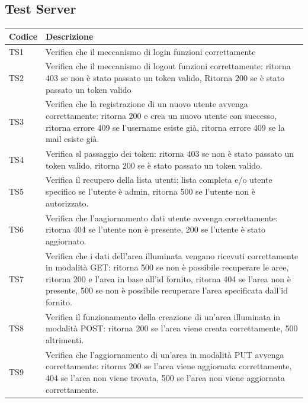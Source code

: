 \documentclass[a4paper, 12pt]{article}
\begin{document}
\subsection*{Test Server}
\setlength\tabcolsep{4pt}
\begin{center}
	\begin{tabularx}{\textwidth}{|X|X|}
	\hline
		\textbf{Codice} & \textbf{Descrizione }  \\
		\hline
		TS1 & Verifica che il meccanismo di login funzioni correttamente           \\
		\hline
		TS2 &  Verifica che il meccanismo di logout funzioni correttamente: ritorna 403 se non è stato passato un token valido, Ritorna 200 se è stato passato un token valido           \\
		\hline
		TS3 & Verifica che la registrazione di un nuovo utente avvenga correttamente: ritorna 200 e crea un nuovo utente con successo, ritorna errore 409 se l'username esiste già, ritorna errore 409 se la mail esiste già.   \\
		\hline
		TS4 &  Verifica sl passaggio dei token: ritorna 403 se non è stato passato un token valido, ritorna 200 se è stato passato un token valido.   \\
		\hline
		TS5 & Verifica il recupero della lista utenti: lista completa e/o utente specifico se l'utente è admin, ritorna 500 se l'utente non è autorizzato.   \\
		\hline
		TS6 & Verifica che l'aagiornamento dati utente avvenga correttamente: ritorna 404 se l'utente non è presente, 200 se l'utente è stato aggiornato.   \\
		\hline
		TS7 & Verifica che i dati dell'area illuminata vengano ricevuti correttamente in modalità GET: ritorna 500 se non è possibile recuperare le aree, ritorna 200 e l'area in base all'id fornito, ritorna 404 se l'area non è presente, 500 se non è possibile recuperare l'area specificata dall'id fornito.   \\
		\hline
		TS8 & Verifica il funzionamento della creazione di un'area illuminata in modalità POST: ritorna 200 se l'area viene creata correttamente, 500 altrimenti.  \\
		\hline
		TS9 & Verifica che l'aggiornamento di un'area in modalità PUT avvenga correttamente: ritorna 200 se l'area viene aggiornata correttamente, 404 se l'area non viene trovata, 500 se l'area non viene aggiornata correttamente.   \\
		\hline
	\end{tabularx}\\[8pt]
	\mbox{}\\
\end{center}
\end{document}
